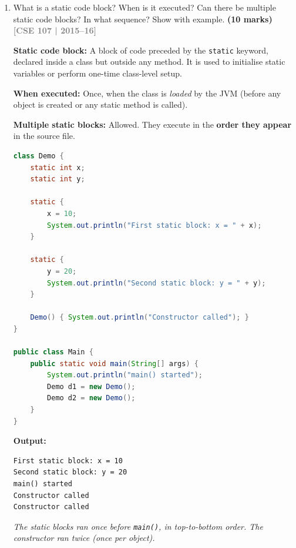 \documentclass[12pt,a3paper]{article}
\newcommand{\yr}[1]{\hfill\textcolor{gray}{\small\textbf{[#1]}}}
\newcommand{\mk}[1]{\textcolor{orange!70!black}{\small\textbf{(#1 marks)}}}
\begin{document}
\begin{enumerate}
\begin{tcolorbox}
\textit{Common use of \texttt{final} class: \texttt{java.lang.String}
is a final class --- it cannot be subclassed to prevent modification
of its behaviour.}

\end{tcolorbox}

\item What is a static code block? When is it executed? Can there be multiple static code blocks? In what sequence? Show with example. \mk{10}
\yr{CSE 107 | 2015--16}

\begin{tcolorbox}[enhanced,breakable,ansbox,
  colback=cD!4,colframe=cD,boxrule=0.8pt,arc=5pt,
  title={\textbf{Answer --- Static Code Block}},
  fonttitle=\bfseries\color{white},colbacktitle=cD]

\textbf{Static code block:} A block of code preceded by the
\texttt{static} keyword, declared inside a class but outside any
method.  It is used to initialise static variables or perform
one-time class-level setup.

\textbf{When executed:} Once, when the class is \emph{loaded} by the
JVM (before any object is created or any static method is called).

\textbf{Multiple static blocks:} Allowed.  They execute in the
\textbf{order they appear} in the source file.

\begin{lstlisting}[language=Java]
class Demo {
    static int x;
    static int y;

    static {
        x = 10;
        System.out.println("First static block: x = " + x);
    }

    static {
        y = 20;
        System.out.println("Second static block: y = " + y);
    }

    Demo() { System.out.println("Constructor called"); }
}

public class Main {
    public static void main(String[] args) {
        System.out.println("main() started");
        Demo d1 = new Demo();
        Demo d2 = new Demo();
    }
}
\end{lstlisting}

\textbf{Output:}
\begin{lstlisting}
First static block: x = 10
Second static block: y = 20
main() started
Constructor called
Constructor called
\end{lstlisting}

\textit{The static blocks ran once before \texttt{main()}, in
top-to-bottom order.  The constructor ran twice (once per object).}


\end{tcolorbox}
\end{enumerate}
\end{document}
